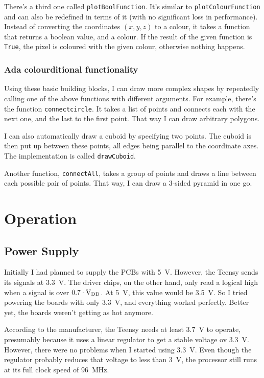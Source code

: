 \documentclass[a4paper, 11pt, titlepage]{report}
\def \vdd {V\textsubscript{DD}}
\begin{document}
There's a third one called \texttt{plotBoolFunction}. It's similar to \texttt{plotColourFunction}
and can also be redefined in terms of it (with no significant loss in performance). Instead of
converting the coordinates $(x, y, z)$ to a colour, it takes a function that returns a boolean
value, and a colour. If the result of the given function is \texttt{True}, the pixel is coloured
with the given colour, otherwise nothing happens.


\subsection{Ada colourditional functionality}

Using these basic building blocks, I can draw more complex shapes by repeatedly calling one of the
above functions with different arguments. For example, there's the function
\texttt{connectcircle}. It takes a list of points and connects each with the next one, and the
last to the first point. That way I can draw arbitrary polygons.

I can also automatically draw a cuboid by specifying two points. The cuboid is then put up between
these points, all edges being parallel to the coordinate axes. The implementation is called
\texttt{drawCuboid}.

Another function, \texttt{connectAll}, takes a group of points and draws a line between each
possible pair of points.  That way, I can draw a 3-sided pyramid in one go.

\chapter{Operation}

\section{Power Supply}

Initially I had planned to supply the PCBs with \SI{5}{\volt}. However, the Teensy sends its
signals at \SI{3.3}{\volt}. The driver chips, on the other hand, only read a logical high when a
signal is over $0.7 \cdot \textrm{\vdd}$. At \SI{5}{\volt}, this value would be \SI{3.5}{\volt}.
So I tried powering the boards with only \SI{3.3}{\volt}, and everything worked perfectly. Better
yet, the boards weren't getting as hot anymore.

According to the manufacturer, the Teensy needs at least \SI{3.7}{\volt} to operate, presumably
because it uses a linear regulator to get a stable voltage ov \SI{3.3}{\volt}. However, there were
no problems when I started using \SI{3.3}{\volt}. Even though the regulator probably reduces that
voltage to less than \SI{3}{\volt}, the processor still runs at its full clock speed of
\SI{96}{\mega\hertz}.
\end{document}
